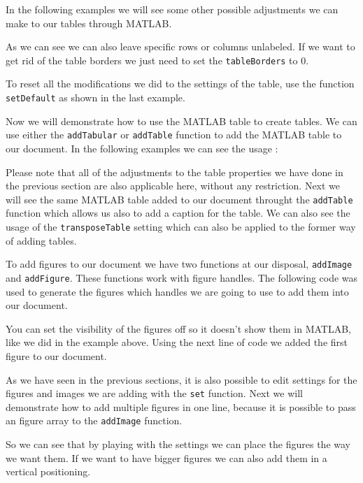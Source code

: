 
In the following examples we will see some other possible adjustments we can make to our tables through MATLAB.
 

As we can see we can also leave specific rows or columns unlabeled. If we want to get rid of the table borders
we just need to set the {\tt tableBorders} to 0.


To reset all the modifications we did to the settings of the table, use the function {\tt setDefault} as shown in the 
last example.


Now we will demonstrate how to use the MATLAB table to create tables. We can use either the {\tt addTabular} or {\tt addTable}
function to add the MATLAB table to our document. In the following examples we can see the usage :


Please note that all of the adjustments to the table properties we have done in the previous section are also applicable 
here, without any restriction. Next we will see the same MATLAB table added to our document throught the {\tt addTable} 
function which allows us also to add a caption for the table. We can also see the usage of the {\tt transposeTable} setting
which can also be applied to the former way of adding tables.


To add figures to our document we have two functions at our disposal, {\tt addImage} and {\tt addFigure}. These functions work
with figure handles. The following code was used to generate the figures which handles we are going to use to add them into 
our document.


You can set the visibility of the figures off so it doesn't show them in MATLAB, like we did in the example above. Using the 
next line of code we added the first figure to our document.


As we have seen in the previous sections, it is also possible to edit settings for the figures and images we are adding with
the {\tt set} function. Next we will demonstrate how to add multiple figures in one line, because it is possible to pass an 
figure array to the {\tt addImage} function.


So we can see that by playing with the settings we can place the figures the way we want them. If we want to have bigger 
figures we can also add them in a vertical positioning.

